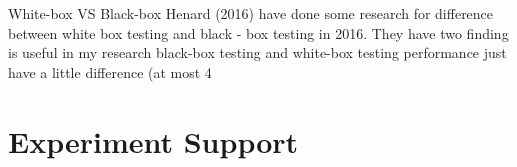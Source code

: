 \documentclass[conference]{IEEEtran}
\begin{document}
White-box VS Black-box
Henard (2016) have done some research for difference between white box testing and black - box testing in 2016. They have two finding is useful in my research black-box testing and white-box testing performance just have a little difference (at most 4%

\section{Experiment Support}
\label{sec:label}
\end{document}
